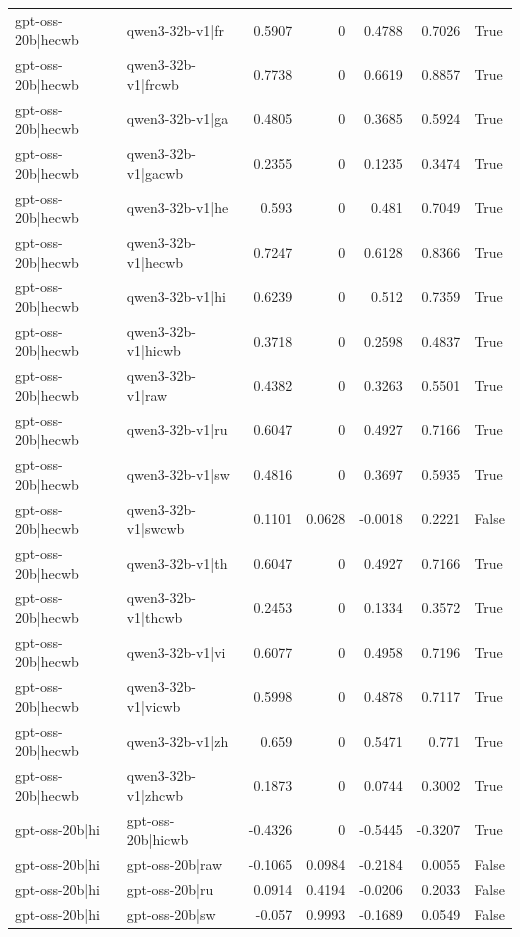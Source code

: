 \begin{table}
\begin{tabular}{l l r r r r l}
gpt-oss-20b|hecwb & qwen3-32b-v1|fr & 0.5907 & 0 & 0.4788 & 0.7026 & True \\
gpt-oss-20b|hecwb & qwen3-32b-v1|frcwb & 0.7738 & 0 & 0.6619 & 0.8857 & True \\
gpt-oss-20b|hecwb & qwen3-32b-v1|ga & 0.4805 & 0 & 0.3685 & 0.5924 & True \\
gpt-oss-20b|hecwb & qwen3-32b-v1|gacwb & 0.2355 & 0 & 0.1235 & 0.3474 & True \\
gpt-oss-20b|hecwb & qwen3-32b-v1|he & 0.593 & 0 & 0.481 & 0.7049 & True \\
gpt-oss-20b|hecwb & qwen3-32b-v1|hecwb & 0.7247 & 0 & 0.6128 & 0.8366 & True \\
gpt-oss-20b|hecwb & qwen3-32b-v1|hi & 0.6239 & 0 & 0.512 & 0.7359 & True \\
gpt-oss-20b|hecwb & qwen3-32b-v1|hicwb & 0.3718 & 0 & 0.2598 & 0.4837 & True \\
gpt-oss-20b|hecwb & qwen3-32b-v1|raw & 0.4382 & 0 & 0.3263 & 0.5501 & True \\
gpt-oss-20b|hecwb & qwen3-32b-v1|ru & 0.6047 & 0 & 0.4927 & 0.7166 & True \\
gpt-oss-20b|hecwb & qwen3-32b-v1|sw & 0.4816 & 0 & 0.3697 & 0.5935 & True \\
gpt-oss-20b|hecwb & qwen3-32b-v1|swcwb & 0.1101 & 0.0628 & -0.0018 & 0.2221 & False \\
gpt-oss-20b|hecwb & qwen3-32b-v1|th & 0.6047 & 0 & 0.4927 & 0.7166 & True \\
gpt-oss-20b|hecwb & qwen3-32b-v1|thcwb & 0.2453 & 0 & 0.1334 & 0.3572 & True \\
gpt-oss-20b|hecwb & qwen3-32b-v1|vi & 0.6077 & 0 & 0.4958 & 0.7196 & True \\
gpt-oss-20b|hecwb & qwen3-32b-v1|vicwb & 0.5998 & 0 & 0.4878 & 0.7117 & True \\
gpt-oss-20b|hecwb & qwen3-32b-v1|zh & 0.659 & 0 & 0.5471 & 0.771 & True \\
gpt-oss-20b|hecwb & qwen3-32b-v1|zhcwb & 0.1873 & 0 & 0.0744 & 0.3002 & True \\
gpt-oss-20b|hi & gpt-oss-20b|hicwb & -0.4326 & 0 & -0.5445 & -0.3207 & True \\
gpt-oss-20b|hi & gpt-oss-20b|raw & -0.1065 & 0.0984 & -0.2184 & 0.0055 & False \\
gpt-oss-20b|hi & gpt-oss-20b|ru & 0.0914 & 0.4194 & -0.0206 & 0.2033 & False \\
gpt-oss-20b|hi & gpt-oss-20b|sw & -0.057 & 0.9993 & -0.1689 & 0.0549 & False \\

\end{tabular}
\end{table}
